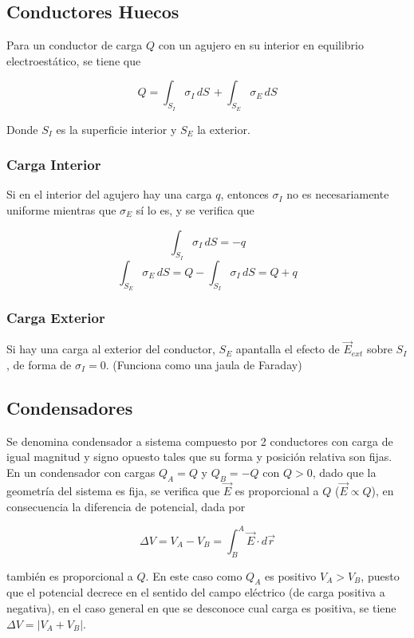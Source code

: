 \subsection{Conductores Huecos}

Para un conductor de carga $Q$ con un agujero en su interior en equilibrio electroestático, se tiene que

\[Q = \int_{S_I}\sigma_I\,dS\,+\int_{S_E}\sigma_E\,dS\]

Donde $S_I$ es la superficie interior y $S_E$ la exterior.

\subsubsection{Carga Interior}

Si en el interior del agujero hay una carga $q$, entonces $\sigma_I$ no es necesariamente uniforme mientras que $\sigma_E$ sí lo es, y se verifica que

\[\int_{S_I}\sigma_I\,dS = -q\]
\[\int_{S_E}\sigma_E\,dS=Q-\int_{S_I}\sigma_I\,dS = Q+q\]

\subsubsection{Carga Exterior}

Si hay una carga al exterior del conductor, $S_E$ apantalla el efecto de $\Vec{E}_{ext}$ sobre $S_I$, de forma de $\sigma_I = 0$. (Funciona como una jaula de Faraday)

\subsection{Condensadores}

Se denomina condensador a sistema compuesto por 2 conductores con carga de igual magnitud y signo opuesto tales que su forma y posición relativa son fijas. En un condensador con cargas $Q_A = Q$ y $Q_B = -Q$ con $Q>0$, dado que la geometría del sistema es fija, se verifica que $\Vec{E}$ es proporcional a $Q$ ($\Vec{E}\propto Q$), en consecuencia la diferencia de potencial, dada por

\[\Delta V = V_A-V_B=\int^A_B \Vec{E} \cdot d\Vec{r}\]

también es proporcional a $Q$. En este caso como $Q_A$ es positivo $V_A > V_B$, puesto que el potencial decrece en el sentido del campo eléctrico (de carga positiva a negativa), en el caso general en que se desconoce cual carga es positiva, se tiene $\Delta V = |V_A + V_B|$.

